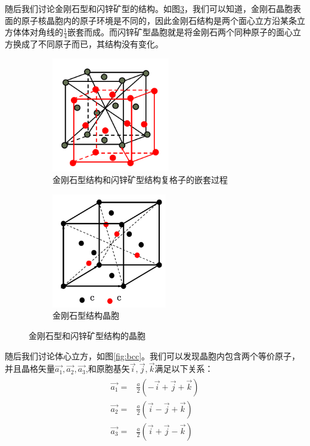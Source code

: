 \documentclass{ctexart}
\begin{document}
    随后我们讨论金刚石型和闪锌矿型的结构。如图\ref{fig:diamond}，我们可以知道，金刚石晶胞表面的原子核晶胞内的原子环境是不同的，因此金刚石结构是两个面心立方沿某条立方体体对角线的$\frac{1}{4}$嵌套而成。而闪锌矿型晶胞就是将金刚石两个同种原子的面心立方换成了不同原子而已，其结构没有变化。
     \begin{figure}[H]
        \begin{subfigure}{0.5\textwidth}
        \includegraphics[width=0.9\linewidth, height=5cm]{figure/fcc_diamond_1.png} 
        \caption{金刚石型结构和闪锌矿型结构复格子的嵌套过程}
        \label{fig:sub_diamond_1}
        \end{subfigure}
        \begin{subfigure}{0.5\textwidth}
        \includegraphics[width=0.9\linewidth, height=5cm]{figure/fcc_diamond_2.png}
        \caption{金刚石型结构晶胞}
        \label{fig:sub_diamond_2}
        \end{subfigure}
        
        \caption{金刚石型和闪锌矿型结构的晶胞}
        \label{fig:diamond}
        \end{figure}
    随后我们讨论体心立方，如图\ref{fig:bcc}。我们可以发现晶胞内包含两个等价原子，并且晶格矢量$\Vec{a_1},\Vec{a_2},\Vec{a_3}$,和原胞基矢$\Vec{i},\Vec{j},\Vec{k}$满足以下关系：
    \begin{align}
        \begin{split}
            \Vec{a_1}=&\frac{a}{2}(-\Vec{i}+\Vec{j}+\Vec{k})\\
            \Vec{a_2}=&\frac{a}{2}(\Vec{i}-\Vec{j}+\Vec{k})\\
            \Vec{a_3}=&\frac{a}{2}(\Vec{i}+\Vec{j}-\Vec{k})
        \end{split}
    \end{align}
    
\end{document}
